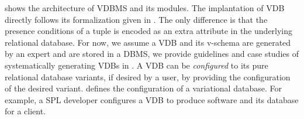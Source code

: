 %
 shows the architecture of VDBMS and its modules.
The implantation of VDB directly follows its formalization given in 
. The only difference is that the presence conditions
of a tuple is encoded as an extra attribute in the underlying relational
database. 
For now, we assume a VDB and its v-schema are generated by an 
expert and are stored in a DBMS, we provide guidelines and case studies of
systematically generating VDBs in 
. A VDB can be \emph{configured} to its pure relational 
database variants, if desired by a user, by providing the configuration
of the desired variant.  defines the configuration of a variational database.
For example, a SPL developer configures a VDB to produce 
software and its database for a client.

